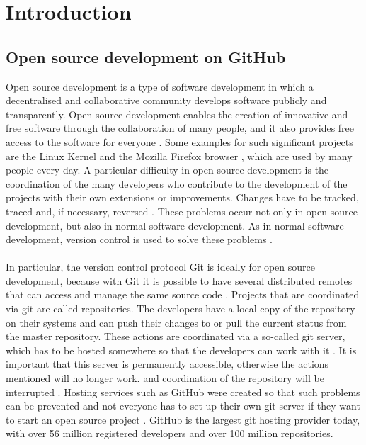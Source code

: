 \documentclass[sigconf]{acmart}
\begin{document}
\section{Introduction}
\subsection{Open source development on GitHub}
Open source development is a type of software development in which a decentralised and collaborative 
community develops software publicly and transparently. Open source development enables the creation 
of innovative and free software through the collaboration of many people, and it also provides free access 
to the software for everyone \cite{shaikh2017governing, redhat2021ops}. Some examples for such significant 
projects are the Linux Kernel \cite{linux2021ops} and the Mozilla Firefox browser \cite{mozilla2021ops}, which are 
used by many people  every day. A particular difficulty in open source development is the coordination of the many 
developers who contribute to the development of the projects with their own extensions or improvements. Changes have 
to be tracked, traced and, if necessary, reversed \cite{shaikh2017governing}. These problems occur not only in open 
source development, but also in normal software development. As in normal software development, version control is 
used to solve these problems \cite{shaikh2017governing, ulrich2020dev}. \\ \\
In particular, the version control protocol Git 
is ideally for open source development, because with Git it is possible to have several distributed remotes that can 
access and manage the same source code \cite{git2021scm, ulrich2020dev}. Projects that are coordinated via git are 
called repositories. The developers have a local copy of the repository on their systems and can push their changes to or 
pull the current status from the master repository. These actions are coordinated via a so-called git server, which has to be 
hosted somewhere so that the developers can work with it \cite{git2021scm}. It is important that this server is permanently 
accessible, otherwise the actions mentioned will no longer work. and coordination of the repository will be 
interrupted \cite{ulrich2020dev}. Hosting services such as GitHub were created so that such problems can be prevented 
and not everyone has to set up their own git server if they want to start an open source project \cite{ulrich2020dev, git2021hub}.
GitHub is the largest git hosting provider today, with over 56 million registered developers and over 100 million repositories.
\end{document}
